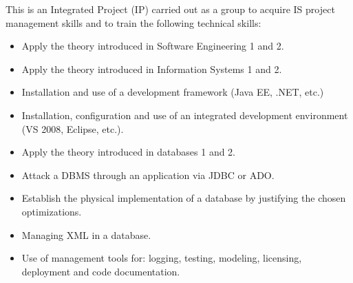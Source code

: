This is an Integrated Project (IP) carried out as a group to acquire IS project management skills and to train the following technical skills:
\begin{itemize}
    \item Apply the theory introduced in Software Engineering 1 and 2.
    \item Apply the theory introduced in Information Systems 1 and 2.
    \item Installation and use of a development framework (Java EE, .NET, etc.)
    \item Installation, configuration and use of an integrated development environment (VS 2008, Eclipse, etc.).
    \item Apply the theory introduced in databases 1 and 2.
    \item Attack a DBMS through an application via JDBC or ADO.
    \item Establish the physical implementation of a database by justifying the chosen optimizations.
    \item Managing XML in a database.
    \item Use of management tools for: logging, testing, modeling, licensing, deployment and code documentation.
\end{itemize}